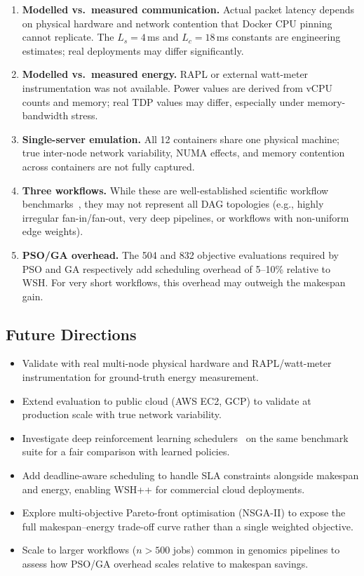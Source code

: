 \documentclass[10pt,twocolumn]{article}
\begin{document}
\begin{enumerate}[leftmargin=1.3cm,label=(\roman*),topsep=2pt,itemsep=1pt]
  \item \textbf{Modelled vs.\ measured communication.} Actual packet latency depends
        on physical hardware and network contention that Docker CPU pinning cannot
        replicate. The $L_s = 4$\,ms and $L_c = 18$\,ms constants are engineering
        estimates; real deployments may differ significantly.
  \item \textbf{Modelled vs.\ measured energy.} RAPL or external watt-meter
        instrumentation was not available. Power values are derived from vCPU counts
        and memory; real TDP values may differ, especially under memory-bandwidth
        stress.
  \item \textbf{Single-server emulation.} All 12 containers share one physical
        machine; true inter-node network variability, NUMA effects, and memory
        contention across containers are not fully captured.
  \item \textbf{Three workflows.} While these are well-established scientific
        workflow benchmarks~\cite{juve2013}, they may not represent all DAG
        topologies (e.g., highly irregular fan-in/fan-out, very deep pipelines, or
        workflows with non-uniform edge weights).
  \item \textbf{PSO/GA overhead.} The 504 and 832 objective evaluations required by
        PSO and GA respectively add scheduling overhead of 5--10\% relative to WSH.
        For very short workflows, this overhead may outweigh the makespan gain.
\end{enumerate}

\subsection{Future Directions}

\begin{itemize}[leftmargin=1.3cm,topsep=2pt,itemsep=1pt]
  \item Validate with real multi-node physical hardware and RAPL/watt-meter
        instrumentation for ground-truth energy measurement.
  \item Extend evaluation to public cloud (AWS EC2, GCP) to validate at production
        scale with true network variability.
  \item Investigate deep reinforcement learning schedulers~\cite{xue2023} on the
        same benchmark suite for a fair comparison with learned policies.
  \item Add deadline-aware scheduling to handle SLA constraints alongside makespan
        and energy, enabling WSH++ for commercial cloud deployments.
  \item Explore multi-objective Pareto-front optimisation (NSGA-II) to expose the
        full makespan--energy trade-off curve rather than a single weighted objective.
  \item Scale to larger workflows ($n > 500$ jobs) common in genomics pipelines to
        assess how PSO/GA overhead scales relative to makespan savings.
\end{itemize}
\end{document}
